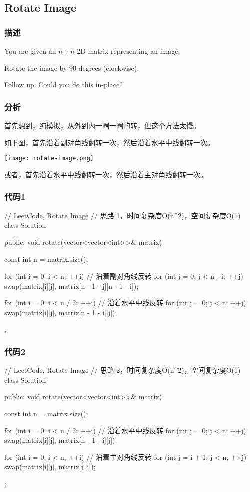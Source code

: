 \subsection{Rotate Image} %
\label{sec:rotate-image}


\subsubsection{描述}
You are given an $n \times n$ 2D matrix representing an image.

Rotate the image by 90 degrees (clockwise).

Follow up:
Could you do this in-place?


\subsubsection{分析}
首先想到，纯模拟，从外到内一圈一圈的转，但这个方法太慢。

如下图，首先沿着副对角线翻转一次，然后沿着水平中线翻转一次。

\begin{center}
\texttt{[image: rotate-image.png]}\\
\label{fig:rotate-image}
\end{center}

或者，首先沿着水平中线翻转一次，然后沿着主对角线翻转一次。


\subsubsection{代码1}
\begin{Code}
// LeetCode, Rotate Image
// 思路 1，时间复杂度O(n^2)，空间复杂度O(1)
class Solution {
public:
    void rotate(vector<vector<int>>& matrix) {
        const int n = matrix.size();

        for (int i = 0; i < n; ++i)  // 沿着副对角线反转
            for (int j = 0; j < n - i; ++j)
                swap(matrix[i][j], matrix[n - 1 - j][n - 1 - i]);

        for (int i = 0; i < n / 2; ++i) // 沿着水平中线反转
            for (int j = 0; j < n; ++j)
                swap(matrix[i][j], matrix[n - 1 - i][j]);
    }
};
\end{Code}

\subsubsection{代码2}
\begin{Code}
// LeetCode, Rotate Image
// 思路 2，时间复杂度O(n^2)，空间复杂度O(1)
class Solution {
public:
    void rotate(vector<vector<int>>& matrix) {
        const int n = matrix.size();

        for (int i = 0; i < n / 2; ++i) // 沿着水平中线反转
            for (int j = 0; j < n; ++j)
                swap(matrix[i][j], matrix[n - 1 - i][j]);

        for (int i = 0; i < n; ++i)  // 沿着主对角线反转
            for (int j = i + 1; j < n; ++j)
                swap(matrix[i][j], matrix[j][i]);
    }
};
\end{Code}


